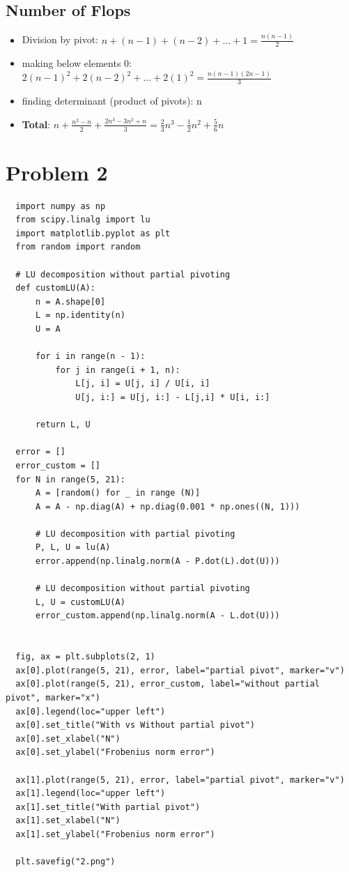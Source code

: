 \documentclass[12pt, letterpaper]{article}
\begin{document}
\subsection*{Number of Flops} 
\begin{itemize}
\item Division by pivot: $n + (n-1) + (n-2) + ... + 1 = \frac{n(n-1)}{2}$
  
\item making below elements $0$: $2(n-1)^2 + 2(n-2)^2 + ... + 2(1)^2 = \frac{n(n-1)(2n-1)}{3}$
  
\item finding determinant (product of pivots): n
  
\item \textbf{Total}: $n + \frac{n^2 - n}{2} + \frac{2n^3 - 3n^2 + n}{3}
  = \frac{2}{3}n^3 - \frac{1}{2}n^2 + \frac{5}{6}n$
\end{itemize}


\pagebreak
\section*{Problem 2}
\label{sec:prob2}

\begin{verbatim}
  import numpy as np
  from scipy.linalg import lu
  import matplotlib.pyplot as plt
  from random import random

  # LU decomposition without partial pivoting
  def customLU(A):
      n = A.shape[0]
      L = np.identity(n)
      U = A

      for i in range(n - 1):
          for j in range(i + 1, n):
              L[j, i] = U[j, i] / U[i, i]
              U[j, i:] = U[j, i:] - L[j,i] * U[i, i:]

      return L, U

  error = []
  error_custom = []
  for N in range(5, 21):
      A = [random() for _ in range (N)]
      A = A - np.diag(A) + np.diag(0.001 * np.ones((N, 1)))

      # LU decomposition with partial pivoting
      P, L, U = lu(A)
      error.append(np.linalg.norm(A - P.dot(L).dot(U)))

      # LU decomposition without partial pivoting
      L, U = customLU(A)
      error_custom.append(np.linalg.norm(A - L.dot(U)))


  fig, ax = plt.subplots(2, 1)
  ax[0].plot(range(5, 21), error, label="partial pivot", marker="v")
  ax[0].plot(range(5, 21), error_custom, label="without partial pivot", marker="x")
  ax[0].legend(loc="upper left")
  ax[0].set_title("With vs Without partial pivot")
  ax[0].set_xlabel("N")
  ax[0].set_ylabel("Frobenius norm error")

  ax[1].plot(range(5, 21), error, label="partial pivot", marker="v")
  ax[1].legend(loc="upper left")
  ax[1].set_title("With partial pivot")
  ax[1].set_xlabel("N")
  ax[1].set_ylabel("Frobenius norm error")

  plt.savefig("2.png")
\end{verbatim}
\end{document}
